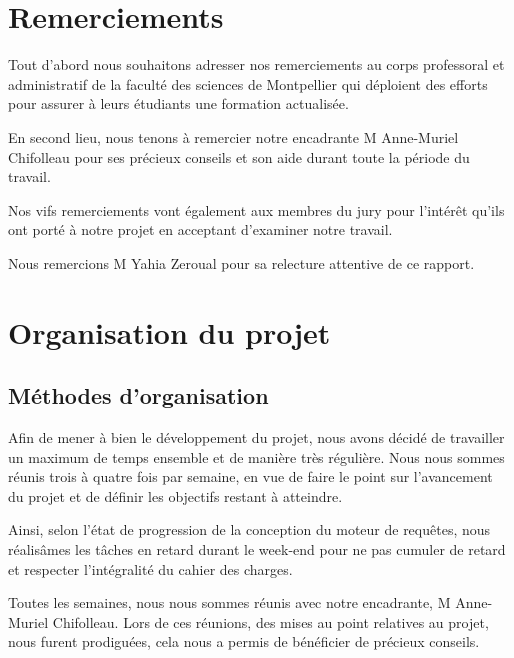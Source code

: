 \documentclass[oneside,13pt,a4paper]{report}
\begin{document}
\chapter*{Remerciements}
\begin{center}

Tout d'abord nous souhaitons adresser nos remerciements au corps professoral et administratif de la faculté des sciences de Montpellier qui déploient des efforts pour assurer à leurs étudiants une formation actualisée.

En second lieu, nous tenons à remercier notre encadrante M Anne-Muriel Chifolleau pour ses précieux conseils et son aide durant toute la période du travail.

Nos vifs remerciements vont également aux membres du jury pour l’intérêt qu’ils ont porté à notre projet en acceptant d’examiner notre travail.

Nous remercions M Yahia Zeroual pour sa relecture attentive de ce rapport.

\end{center}

\parskip=0pt
\tableofcontents

\parskip=5pt

\chapter{Organisation du projet}
\section{Méthodes d’organisation}

Afin de mener à bien le développement du projet, nous avons décidé de travailler un maximum de temps ensemble et de manière très régulière. Nous nous sommes réunis trois à quatre fois par semaine, en vue de faire le point sur l'avancement du projet et de définir les objectifs restant à atteindre.

Ainsi, selon l'état de progression de la conception du moteur de requêtes, nous réalisâmes les tâches en retard durant le week-end pour ne pas cumuler de retard et respecter l'intégralité du cahier des charges.

Toutes les semaines, nous nous sommes réunis avec notre encadrante, M Anne-Muriel Chifolleau. Lors de ces réunions, des mises au point relatives au projet, nous furent prodiguées, cela nous a permis de bénéficier de précieux conseils.
\end{document}
